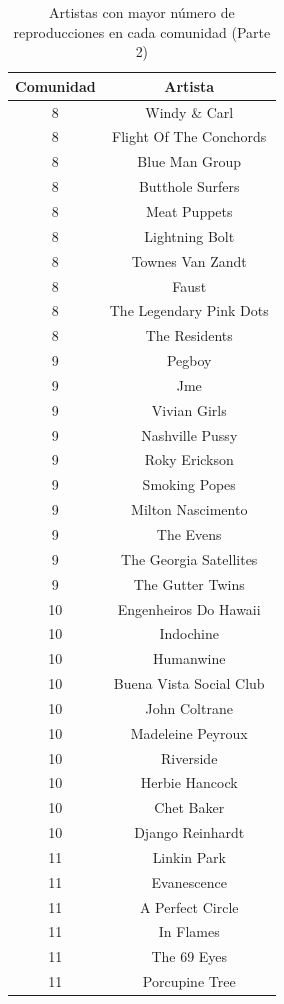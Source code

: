 \documentclass[conference]{IEEEtran}
\begin{document}
\begin{table}[]
\label{table:artistas_representantes_comunidad_pt2}
\caption{Artistas con mayor número de reproducciones en cada comunidad (Parte 2)}
\centering
\begin{tabular}{|c|c|}
  \hline
 Comunidad & Artista \\ 
  \hline
8 & Windy \& Carl \\ 
8 & Flight Of The Conchords \\ 
8 & Blue Man Group \\ 
8 & Butthole Surfers \\ 
8 & Meat Puppets \\ 
8 & Lightning Bolt \\ 
8 & Townes Van Zandt \\ 
8 & Faust \\ 
8 & The Legendary Pink Dots \\ 
8 & The Residents \\  \hline
9 & Pegboy \\ 
9 & Jme \\ 
9 & Vivian Girls \\ 
9 & Nashville Pussy \\ 
9 & Roky Erickson \\ 
9 & Smoking Popes \\ 
9 & Milton Nascimento \\ 
9 & The Evens \\ 
9 & The Georgia Satellites \\ 
9 & The Gutter Twins \\  \hline
10 & Engenheiros Do Hawaii \\ 
10 & Indochine \\ 
10 & Humanwine \\ 
10 & Buena Vista Social Club \\ 
10 & John Coltrane \\ 
10 & Madeleine Peyroux \\ 
10 & Riverside \\ 
10 & Herbie Hancock \\ 
10 & Chet Baker \\ 
10 & Django Reinhardt \\  \hline
11 & Linkin Park \\ 
11 & Evanescence \\ 
11 & A Perfect Circle \\ 
11 & In Flames \\ 
11 & The 69 Eyes \\ 
11 & Porcupine Tree \\ 

\end{tabular}
\end{table}
\end{document}
